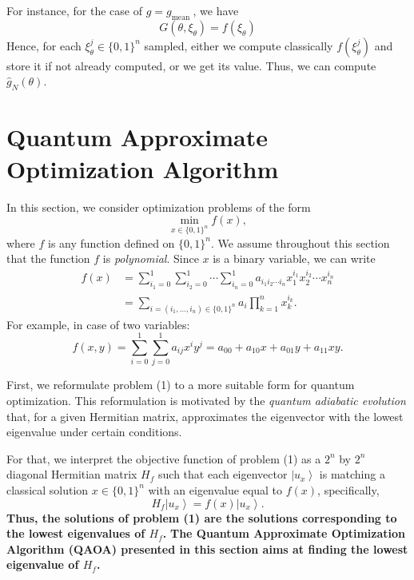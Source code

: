 \begin{example}
For instance, for the case of $g=g_{\text {mean }}$, we have
\begin{equation}
    G\left(\theta, \xi_{\theta}\right)=f\left(\xi_{\theta}\right)
\end{equation}
Hence, for each $\xi_{\theta}^{j} \in\{0,1\}^{n}$ sampled, either we compute classically $f(\xi_{\theta}^{j})$ and store it if not already computed, or we get its value. Thus, we can compute $\hat{g}_{N}(\theta)$. 
\end{example}

\section{Quantum Approximate Optimization Algorithm}

In this section, we consider optimization problems of the form
\begin{equation}
    \min _{x \in\{0,1\}^n} f(x), \tag{1}
\end{equation}
where $f$ is any function defined on $\{0,1\}^n$. We assume throughout this section that the function $f$ is \textit{polynomial}. Since $x$ is a binary variable,  we can write
\begin{align}
    f(x)&=\sum_{i_1=0}^1 \sum_{i_2=0}^1 \cdots \sum_{i_n=0}^1 a_{i_1 i_2 \cdots i_n} x_1^{i_1} x_2^{i_2} \cdots x_n^{i_n}\\
    &=\sum_{i=\left(i_1, \ldots ,i_n\right) \in\{0,1\}^n} a_i \prod_{k=1}^n x_k^{i_k}.
\end{align}
For example, in case of two variables:
\begin{equation}
    f(x, y)=\sum_{i=0}^1 \sum_{j=0}^1 a_{i j} x^i y^j=a_{00}+a_{10} x+a_{01} y+a_{11} x y.
\end{equation}

First, we reformulate problem (1) to a more suitable form for quantum optimization. This reformulation is motivated by the \textit{quantum adiabatic evolution} that, for a given Hermitian matrix, approximates the eigenvector with the lowest eigenvalue under certain conditions. 

For that, we interpret the objective function of problem (1) as a $2^n$ by $2^n$ diagonal Hermitian matrix $H_{f}$ such that each eigenvector $\left|u_{x}\right\rangle$ is matching a classical solution $x \in\{0,1\}^{n}$ with an eigenvalue equal to $f(x)$, specifically,
\begin{equation}
    H_{f}\left|u_{x}\right\rangle=f(x)\left|u_{x}\right\rangle .
\end{equation}
\textbf{Thus, the solutions of problem (1) are the solutions corresponding to the lowest eigenvalues of $H_{f}$.} \textbf{The Quantum Approximate Optimization Algorithm (QAOA) presented in this section aims at finding the lowest eigenvalue of $H_{f}$.} %


